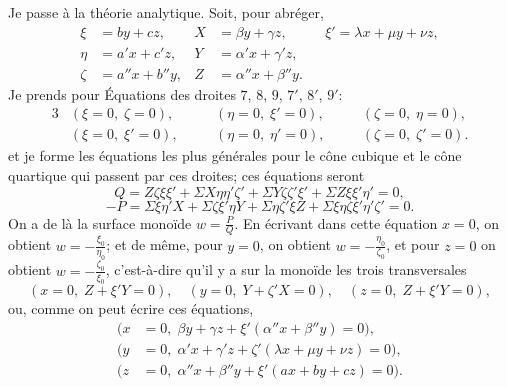 \documentclass[11pt,a4paper]{article}
\begin{document}
\clearpage

Je passe \`{a} la th\'{e}orie analytique. Soit, pour abr\'{e}ger,
\begin{align*}
\xi &= by + cz, & X &= \beta y + \gamma z, & &\xi' = \lambda x + \mu y + \nu z, \\
\eta &= a'x + c'z, & Y &= \alpha'x + \gamma'z, & & \\
\zeta &= a''x + b''y, & Z &= \alpha''x + \beta''y. & &
\end{align*}
Je prends pour \'{E}quations des droites $7$, $8$, $9$, $7'$, $8'$, $9'$:
\begin{alignat*}{3}
&(\xi = 0, \; \zeta = 0), \quad &&(\eta = 0, \; \xi' = 0), \quad &&(\zeta = 0, \; \eta = 0), \\
&(\xi = 0, \; \xi' = 0), \quad &&(\eta = 0, \; \eta' = 0), \quad &&(\zeta = 0, \; \zeta' = 0).
\end{alignat*}
et je forme les \'{e}quations les plus g\'{e}n\'{e}rales pour le c\^{o}ne cubique et le c\^{o}ne quartique qui passent par ces droites; ces \'{e}quations seront
\[
Q = Z\zeta\xi\xi' + \Sigma X\eta\eta'\zeta' + \Sigma Y\zeta\zeta'\xi' + \Sigma Z\xi\xi'\eta' = 0,
\]
\[
-P = \Sigma\xi\eta'X + \Sigma\zeta\xi'\eta Y + \Sigma\eta\zeta'\xi Z + \Sigma\xi\eta\zeta\xi'\eta'\zeta' = 0.
\]
On a de l\`{a} la surface mono\"{i}de $w = \frac{P}{Q}$. En \'{e}crivant dans cette \'{e}quation $x = 0$, on obtient $w = -\frac{\xi_0}{\eta_0}$; et de m\^{e}me, pour $y = 0$, on obtient $w = -\frac{\eta_0}{\zeta_0}$, et pour $z = 0$ on obtient $w = -\frac{\zeta_0}{\xi_0}$, c'est-\`{a}-dire qu'il y a sur la mono\"{i}de les trois transversales
\[
(x = 0, \; Z + \xi'Y = 0), \quad (y = 0, \; Y + \zeta'X = 0), \quad (z = 0, \; Z + \xi'Y = 0),
\]
ou, comme on peut \'{e}crire ces \'{e}quations,
\begin{align*}
(x &= 0, \; \beta y + \gamma z + \xi'(\alpha''x + \beta''y) = 0), \\
(y &= 0, \; \alpha'x + \gamma'z + \zeta'(\lambda x + \mu y + \nu z) = 0), \\
(z &= 0, \; \alpha''x + \beta''y + \xi'(ax + by + cz) = 0).
\end{align*}
\end{document}
